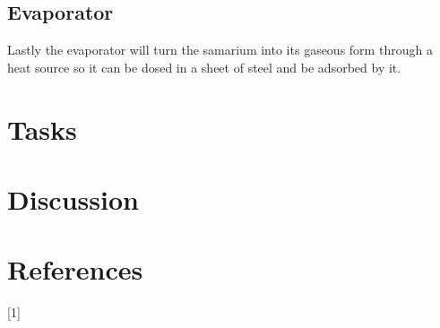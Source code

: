 \documentclass{article}
\begin{document}
\subsection{Evaporator}
Lastly the evaporator will turn the samarium into its gaseous form through a heat source so it can be dosed in a sheet of steel and be adsorbed by it.
\section{Tasks}
\section{Discussion}



\section*{References}

[1] 
\end{document}
